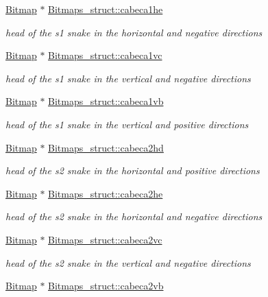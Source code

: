\begin{DoxyCompactItemize}
\hyperlink{structBitmap}{Bitmap} $\ast$ \hyperlink{group__graphics_ga5989c4f83267088c9fdb6d1251d2e092}{Bitmaps\+\_\+struct\+::cabeca1he}
\begin{DoxyCompactList}\small\item\em head of the s1 snake in the horizontal and negative directions \end{DoxyCompactList}\item 
\hyperlink{structBitmap}{Bitmap} $\ast$ \hyperlink{group__graphics_ga257cc4fca4ad7cceb125e4e43f62a17b}{Bitmaps\+\_\+struct\+::cabeca1vc}
\begin{DoxyCompactList}\small\item\em head of the s1 snake in the vertical and negative directions \end{DoxyCompactList}\item 
\hyperlink{structBitmap}{Bitmap} $\ast$ \hyperlink{group__graphics_ga5737d3b582663eb60cd3fd47421707b3}{Bitmaps\+\_\+struct\+::cabeca1vb}
\begin{DoxyCompactList}\small\item\em head of the s1 snake in the vertical and positive directions \end{DoxyCompactList}\item 
\hyperlink{structBitmap}{Bitmap} $\ast$ \hyperlink{group__graphics_ga74f59c6b2020b67b1e4c40b4d07b7dcb}{Bitmaps\+\_\+struct\+::cabeca2hd}
\begin{DoxyCompactList}\small\item\em head of the s2 snake in the horizontal and positive directions \end{DoxyCompactList}\item 
\hyperlink{structBitmap}{Bitmap} $\ast$ \hyperlink{group__graphics_gad921a321d31f1c5f8430770b09949bd8}{Bitmaps\+\_\+struct\+::cabeca2he}
\begin{DoxyCompactList}\small\item\em head of the s2 snake in the horizontal and negative directions \end{DoxyCompactList}\item 
\hyperlink{structBitmap}{Bitmap} $\ast$ \hyperlink{group__graphics_gabcbbaac60aafd8e9549fcef5fa6acb83}{Bitmaps\+\_\+struct\+::cabeca2vc}
\begin{DoxyCompactList}\small\item\em head of the s2 snake in the vertical and negative directions \end{DoxyCompactList}\item 
\hyperlink{structBitmap}{Bitmap} $\ast$ \hyperlink{group__graphics_ga50f31017797fe46247d3ef644f6670c9}{Bitmaps\+\_\+struct\+::cabeca2vb}

\end{DoxyCompactItemize}
